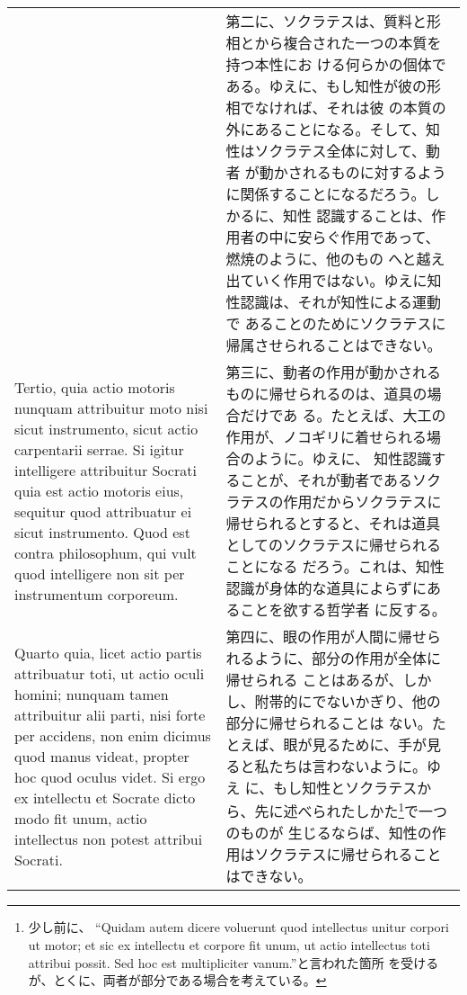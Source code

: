 \documentclass[paper=a4paper,fontsize=10pt,jafontsize=9pt,titlepage]{jlreq}
\begin{document}
\begin{longtable}{p{21em}p{21em}}
&

第二に、ソクラテスは、質料と形相とから複合された一つの本質を持つ本性にお
ける何らかの個体である。ゆえに、もし知性が彼の形相でなければ、それは彼
の本質の外にあることになる。そして、知性はソクラテス全体に対して、動者
が動かされるものに対するように関係することになるだろう。しかるに、知性
認識することは、作用者の中に安らぐ作用であって、燃焼のように、他のもの
へと越え出ていく作用ではない。ゆえに知性認識は、それが知性による運動で
あることのためにソクラテスに帰属させられることはできない。
 
\\


 Tertio, quia actio motoris nunquam attribuitur moto nisi sicut
 instrumento, sicut actio carpentarii serrae. Si igitur intelligere
 attribuitur Socrati quia est actio motoris eius, sequitur quod
 attribuatur ei sicut instrumento. Quod est contra philosophum, qui
 vult quod intelligere non sit per instrumentum corporeum.

 
&

第三に、動者の作用が動かされるものに帰せられるのは、道具の場合だけであ
る。たとえば、大工の作用が、ノコギリに着せられる場合のように。ゆえに、
知性認識することが、それが動者であるソクラテスの作用だからソクラテスに
帰せられるとすると、それは道具としてのソクラテスに帰せられることになる
だろう。これは、知性認識が身体的な道具によらずにあることを欲する哲学者
に反する。
 
\\


 Quarto quia, licet actio partis attribuatur toti, ut actio oculi
 homini; nunquam tamen attribuitur alii parti, nisi forte per
 accidens, non enim dicimus quod manus videat, propter hoc quod oculus
 videt. Si ergo ex intellectu et Socrate dicto modo fit unum, actio
 intellectus non potest attribui Socrati. 

 
&

第四に、眼の作用が人間に帰せられるように、部分の作用が全体に帰せられる
ことはあるが、しかし、附帯的にでないかぎり、他の部分に帰せられることは
ない。たとえば、眼が見るために、手が見ると私たちは言わないように。ゆえ
に、もし知性とソクラテスから、先に述べられたしかた\footnote{少し前に、
``Quidam autem dicere voluerunt quod intellectus unitur corpori ut
motor; et sic ex intellectu et corpore fit unum, ut actio intellectus
toti attribui possit. Sed hoc est multipliciter vanum.''と言われた箇所
を受けるが、とくに、両者が部分である場合を考えている。}で一つのものが
生じるならば、知性の作用はソクラテスに帰せられることはできない。
 

\end{longtable}
\end{document}
